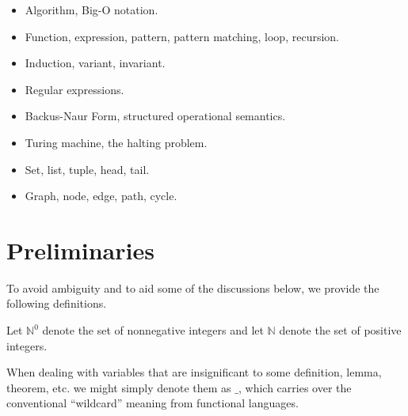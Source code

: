 \begin{itemize}

\item Algorithm, Big-O notation.

\item Function, expression, pattern, pattern matching, loop, recursion.

\item Induction, variant, invariant.

\item Regular expressions.

\item Backus-Naur Form, structured operational semantics.

\item Turing machine, the halting problem.

\item Set, list, tuple, head, tail.

\item Graph, node, edge, path, cycle.

\end{itemize}

\section{Preliminaries}

To avoid ambiguity and to aid some of the discussions below, we provide the
following definitions.

\begin{definition} Let $\mathbb{N}^0$ denote the set of nonnegative integers
and let $\mathbb{N}$ denote the set of positive integers.\end{definition}

\begin{definition} When dealing with variables that are insignificant to some
definition, lemma, theorem, etc. we might simply denote them as $\_$, which
carries over the conventional ``wildcard'' meaning from functional
languages.\end{definition}

